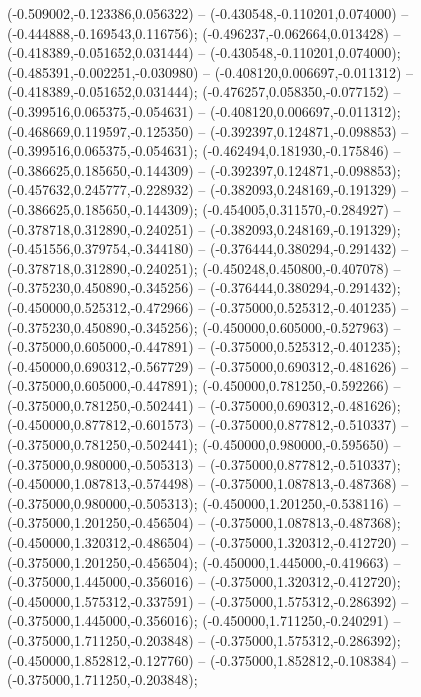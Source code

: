  (-0.509002,-0.123386,0.056322) -- (-0.430548,-0.110201,0.074000) -- (-0.444888,-0.169543,0.116756);
 (-0.496237,-0.062664,0.013428) -- (-0.418389,-0.051652,0.031444) -- (-0.430548,-0.110201,0.074000);
 (-0.485391,-0.002251,-0.030980) -- (-0.408120,0.006697,-0.011312) -- (-0.418389,-0.051652,0.031444);
 (-0.476257,0.058350,-0.077152) -- (-0.399516,0.065375,-0.054631) -- (-0.408120,0.006697,-0.011312);
 (-0.468669,0.119597,-0.125350) -- (-0.392397,0.124871,-0.098853) -- (-0.399516,0.065375,-0.054631);
 (-0.462494,0.181930,-0.175846) -- (-0.386625,0.185650,-0.144309) -- (-0.392397,0.124871,-0.098853);
 (-0.457632,0.245777,-0.228932) -- (-0.382093,0.248169,-0.191329) -- (-0.386625,0.185650,-0.144309);
 (-0.454005,0.311570,-0.284927) -- (-0.378718,0.312890,-0.240251) -- (-0.382093,0.248169,-0.191329);
 (-0.451556,0.379754,-0.344180) -- (-0.376444,0.380294,-0.291432) -- (-0.378718,0.312890,-0.240251);
 (-0.450248,0.450800,-0.407078) -- (-0.375230,0.450890,-0.345256) -- (-0.376444,0.380294,-0.291432);
 (-0.450000,0.525312,-0.472966) -- (-0.375000,0.525312,-0.401235) -- (-0.375230,0.450890,-0.345256);
 (-0.450000,0.605000,-0.527963) -- (-0.375000,0.605000,-0.447891) -- (-0.375000,0.525312,-0.401235);
 (-0.450000,0.690312,-0.567729) -- (-0.375000,0.690312,-0.481626) -- (-0.375000,0.605000,-0.447891);
 (-0.450000,0.781250,-0.592266) -- (-0.375000,0.781250,-0.502441) -- (-0.375000,0.690312,-0.481626);
 (-0.450000,0.877812,-0.601573) -- (-0.375000,0.877812,-0.510337) -- (-0.375000,0.781250,-0.502441);
 (-0.450000,0.980000,-0.595650) -- (-0.375000,0.980000,-0.505313) -- (-0.375000,0.877812,-0.510337);
 (-0.450000,1.087813,-0.574498) -- (-0.375000,1.087813,-0.487368) -- (-0.375000,0.980000,-0.505313);
 (-0.450000,1.201250,-0.538116) -- (-0.375000,1.201250,-0.456504) -- (-0.375000,1.087813,-0.487368);
 (-0.450000,1.320312,-0.486504) -- (-0.375000,1.320312,-0.412720) -- (-0.375000,1.201250,-0.456504);
 (-0.450000,1.445000,-0.419663) -- (-0.375000,1.445000,-0.356016) -- (-0.375000,1.320312,-0.412720);
 (-0.450000,1.575312,-0.337591) -- (-0.375000,1.575312,-0.286392) -- (-0.375000,1.445000,-0.356016);
 (-0.450000,1.711250,-0.240291) -- (-0.375000,1.711250,-0.203848) -- (-0.375000,1.575312,-0.286392);
 (-0.450000,1.852812,-0.127760) -- (-0.375000,1.852812,-0.108384) -- (-0.375000,1.711250,-0.203848);
